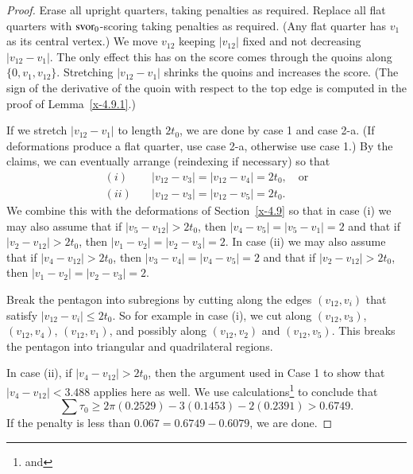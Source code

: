 \begin{proof}
Erase all upright quarters, taking penalties as required.  Replace
all flat quarters with $\operatorname{svor}_0$-scoring taking penalties as
required. (Any flat quarter has $v_1$ as its central vertex.) We
move $v_{12}$ keeping $|v_{12}|$ fixed and not decreasing
$|v_{12}-v_1|$.  The only effect this has on the score comes
through the quoins along $\{0,v_1,v_{12}\}$. Stretching
$|v_{12}-v_1|$ shrinks the quoins and increases the score. (The
sign of the derivative of the quoin with respect to the top edge
is computed in the proof of Lemma~\ref{x-4.9.1}.)

If we stretch $|v_{12}-v_1|$ to length $2t_0$, we are done by case
1 and case 2-a. (If deformations produce a flat quarter, use case
2-a, otherwise use case 1.) By the claims, we can eventually
arrange (reindexing if necessary) so that
$$
\begin{array}{lll}
(i)&\quad |v_{12}-v_3|=|v_{12}-v_4|=2t_0,\quad\text{or}\\
(ii)&\quad |v_{12}-v_3|=|v_{12}-v_5|=2t_0.
\end{array}
$$
We combine this with the deformations of Section~\ref{x-4.9} so
that in case (i) we may also assume that if $|v_5-v_{12}|>2t_0$,
then $|v_4-v_5|=|v_5-v_1|=2$ and that if $|v_2-v_{12}|>2t_0$, then
$|v_1-v_2|=|v_2-v_3|=2$. In case (ii) we may also assume that if
$|v_4-v_{12}|>2t_0$, then $|v_3-v_4|=|v_4-v_5|=2$ and that if
$|v_2-v_{12}|>2t_0$, then $|v_1-v_2|=|v_2-v_3|=2$.

Break the pentagon into subregions by cutting along the edges
$(v_{12},v_i)$ that satisfy $|v_{12}-v_i|\le2t_0$. So for example
in case (i), we cut along $(v_{12},v_3)$, $(v_{12},v_4)$,
$(v_{12},v_1)$, and possibly along $(v_{12},v_2)$ and
$(v_{12},v_5)$.  This breaks the pentagon into triangular and
quadrilateral regions.

In case (ii), if $|v_4-v_{12}|>2t_0$, then the argument used in
Case 1 to show that $|v_4-v_{12}|<3.488$ applies here as well.
We use
calculations\footnote{ and } to
conclude that
    $$\sum\tau_0 \ge 2\pi (0.2529) -3 (0.1453) -2 (0.2391) > 0.6749.$$
If the penalty is less than $0.067=0.6749-0.6079$, we are done.


\end{proof}
